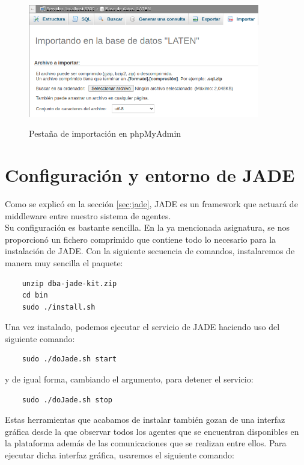\begin{figure}[h]
\centering
\includegraphics[width=0.9\textwidth]{logos/menubd2.png}\\[1.4cm]
\caption{Pestaña de importación en phpMyAdmin}
\label{img:menubd2}
\end{figure}


\section{Configuración y entorno de JADE}

Como se explicó en la sección \ref{sec:jade}, JADE es un framework que actuará de middleware entre nuestro sistema de agentes.\\

Su configuración es bastante sencilla. En la ya mencionada asignatura, se nos proporcionó un fichero comprimido que contiene todo lo necesario para la instalación de JADE. Con la siguiente secuencia de comandos, instalaremos de manera muy sencilla el paquete:

\begin{lstlisting}
    unzip dba-jade-kit.zip
    cd bin
    sudo ./install.sh
\end{lstlisting}

Una vez instalado, podemos ejecutar el servicio de JADE haciendo uso del siguiente comando:

\begin{lstlisting}
    sudo ./doJade.sh start
\end{lstlisting}

y de igual forma, cambiando el argumento, para detener el servicio:

\begin{lstlisting}
    sudo ./doJade.sh stop
\end{lstlisting}

Estas herramientas que acabamos de instalar también gozan de una interfaz gráfica desde la que observar todos los agentes que se encuentran disponibles en la plataforma además de las comunicaciones que se realizan entre ellos. Para ejecutar dicha interfaz gráfica, usaremos el siguiente comando:

